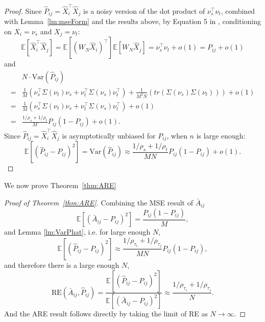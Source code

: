 \documentclass[journal,twoside,web]{ieeecolor}
\newcommand{\Ex}{\mathbb{E}}
\begin{document}
\begin{proof}
Since $\hat{P}_{ij} = \hat{X}_i^{\top} \hat{X}_j$ is a noisy version of the dot product of $\nu_s^{\top} \nu_t$, combined with Lemma~\ref{lm:mseForm} and the results above, by Equation 5 in , conditioning on $X_i = \nu_s$ and $X_j = \nu_t$:
\[
	\Ex[\hat{X}_i^{\top} \hat{X}_j] = \Ex[(W_N \hat{X}_i)^{\top}] \Ex[W_N \hat{X}_j] = \nu_s^{\top} \nu_t+o(1) = P_{ij}+o(1)
\]
and
\begin{align*}
	& N \cdot \mathrm{Var} (\hat{P}_{ij}) \\
    = & \frac{1}{M} \left( \nu_s^{\top} \Sigma(\nu_t) \nu_s + \nu_t^{\top} \Sigma(\nu_s) \nu_t^{\top} \right)
    + \frac{1}{M^2 N} \left( tr(\Sigma(\nu_s) \Sigma(\nu_t)) \right) +o(1)\\
    = & \frac{1}{M} \left( \nu_s^{\top} \Sigma(\nu_t) \nu_s + \nu_t^{\top} \Sigma(\nu_s) \nu_t^{\top} \right)+o(1) \\
    = & \frac{1/\rho_s + 1/\rho_t}{M} P_{ij}(1-P_{ij}) + o(1).
\end{align*}
Since $\hat{P}_{ij} = \hat{X}_i^{\top} \hat{X}_j$ is asymptotically unbiased for $P_{ij}$, when $n$ is large enough:
\[
    \Ex[(\hat{P}_{ij} - P_{ij})^2] = \mathrm{Var}(\hat{P}_{ij}) \approx
    \frac{1/\rho_s + 1/\rho_t}{M N} P_{ij}(1-P_{ij})+o(1).
\]
\end{proof}

We now prove Theorem~\ref{thm:ARE}
\begin{proof}[Proof of Theorem~\ref{thm:ARE}]
Combining the MSE result of $\bar{A}_{ij}$
\[
    \Ex[(\bar{A}_{ij} - P_{ij})^2] = \frac{P_{ij}(1-P_{ij})}{M},
\]
and Lemma \ref{lm:VarPhat}, i.e. for large enough $N$,
\[
    \Ex[(\hat{P}_{ij} - P_{ij})^2] \approx
    \frac{1/\rho_{\tau_i} + 1/\rho_{\tau_j}}{M N} P_{ij}(1-P_{ij}),
\]
and therefore there is a large enough $N$,
\[
	    \mathrm{RE}(\bar{A}_{ij}, \hat{P}_{ij}) %
	    = \frac{\Ex[(\hat{P}_{ij} - P_{ij})^2]}{\Ex[(\bar{A}_{ij} - P_{ij})^2]}
	    \approx \frac{1/\rho_{\tau_i} + 1/\rho_{\tau_j}}{N}.
\]
And the ARE result follows directly by taking the limit of RE as $N\to \infty$.
\end{proof}
\end{document}
